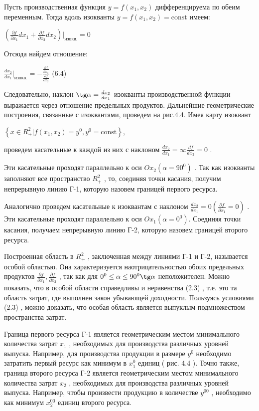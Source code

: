 \documentclass[12pt, 4paper]{book}
\begin{document}
{Пусть производственная функция $y=f(x_1,x_2)$ дифференцируема по обеим переменным. Тогда вдоль изокванты $y=f(x_1,x_2)=\text{const}$ имеем: 
\begin{center}
$(\frac{\partial f}{\partial x_1}d x_1 + \frac{\partial f}{\partial x_2}d x_2)|_{\text{изокв.}}=0$
\end{center}
Отсюда найдем отношение: 
\begin{center}
$\frac{d x_2}{d x_1}|_{\text{изокв.}}=-\frac{\frac{\partial f}{\partial x_1}}{\frac{\partial f}{\partial x_2}} $ (6.4)
\end{center}
Следовательно, наклон $\tg \alpha = \frac{dx_2}{d x_1}$ изокванты производственной функции выражается через отношение предельных продуктов. Дальнейшие геометрические построения, связанные с изоквантами, проведем на рис.4.4.
Имея карту изоквант 
\begin{center}
$\left\{x \in R_{+}^{2}| f(x_1,x_2)=y^0 , y^0 = \text{const} \right\}$,
\end{center}
проведем касательные к каждой из них с наклоном $\frac{d x_2}{d x_1} = \infty \frac{d f}{d x_2}= 0$ .
\par

Эти касательные проходят параллельно к оси $Ox_2(\alpha = 90^0)$ . Так как изокванты заполняют все пространство $R_{+}^{2}$ , то, соединяя точки касания, получим непрерывную линию Г-1, которую назовем границей первого ресурса.
\par
 
Аналогично проведем касательные к изоквантам с наклоном $\frac{d x_2}{d x_1}=0(\frac{\partial f}{\partial x_1}=0)$ . Эти касательные проходят параллельно к оси $Ox_1(\alpha = 0^0)$. Соединяя точки касания, получаем непрерывную линию Г-2, которую назовем границей второго ресурса. 
\par

Построенная область в $R_{+}^{2}$ , заключенная между линиями Г-1 и Г-2, называется особой областью. Она характеризуется наотрицательностью обоих предельных продуктов $\frac{\partial f}{\partial x_1}, \frac{\partial f}{\partial x_2}$ , так как для $0^0 \leq \alpha \leq 90^0 \tg \alpha$ неположителен. Можно показать, что в особой области справедливы и неравенства (2.3) , т.е. это та область затрат, где выполнен закон убывающей доходности. Пользуясь условиями (2.3) , можно доказать, что особая область является выпуклым подмножеством пространства затрат. 
\par

Граница первого ресурса Г-1 является геометрическим местом минимального количества затрат $x_1$ , необходимых для производства различных уровней выпуска. Например, для производства продукции в размере $y^0$ необходимо затратить первый ресурс как минимум в $x_{1}^{0}$ единиц ( рис. 4.4 ). Точно также, граница второго ресурса Г-2 является геометрическим местом минимального количества затрат $x_2$ , необходимых для производства различных уровней выпуска. Например, чтобы произвести продукцию в количестве $y^{00}$ , необходимо как минимум $x_{2}^{00}$ единиц второго ресурса. 
\par

}
\end{document}
